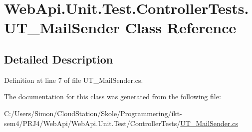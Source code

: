 \hypertarget{class_web_api_1_1_unit_1_1_test_1_1_controller_tests_1_1_u_t___mail_sender}{}\section{Web\+Api.\+Unit.\+Test.\+Controller\+Tests.\+U\+T\+\_\+\+Mail\+Sender Class Reference}
\label{class_web_api_1_1_unit_1_1_test_1_1_controller_tests_1_1_u_t___mail_sender}


\subsection{Detailed Description}


Definition at line 7 of file U\+T\+\_\+\+Mail\+Sender.\+cs.



The documentation for this class was generated from the following file\+:\begin{DoxyCompactItemize}
\item 
C\+:/\+Users/\+Simon/\+Cloud\+Station/\+Skole/\+Programmering/ikt-\/sem4/\+P\+R\+J4/\+Web\+Api/\+Web\+Api.\+Unit.\+Test/\+Controller\+Tests/\mbox{\hyperlink{_u_t___mail_sender_8cs}{U\+T\+\_\+\+Mail\+Sender.\+cs}}\end{DoxyCompactItemize}
